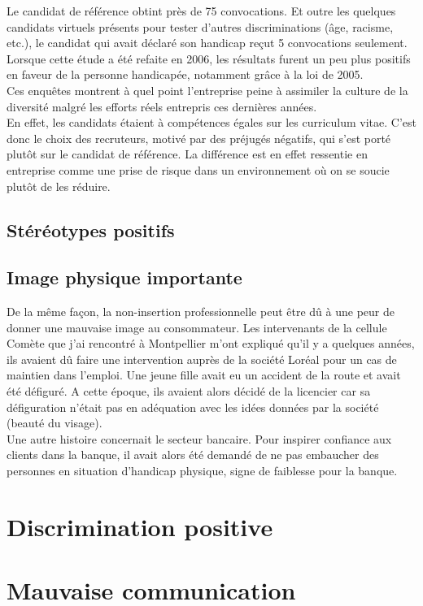 Le candidat de référence obtint près de 75 convocations.
Et outre les quelques candidats virtuels présents pour tester d'autres discriminations (\^age, racisme, etc.), le candidat qui avait déclaré son handicap reçut 5 convocations seulement.\\

Lorsque cette étude a été refaite en 2006, les résultats furent un peu plus positifs en faveur de la personne handicapée, notamment gr\^ace à la loi de 2005.\\

Ces enqu\^etes montrent à quel point l'entreprise peine à assimiler la culture de la diversité malgré les efforts réels entrepris ces dernières années. \\
En effet, les candidats étaient à compétences égales sur les curriculum vitae. C'est donc le choix des recruteurs, motivé par des préjugés négatifs, qui s'est porté plut\^ot sur le candidat de référence. La différence est en effet ressentie en entreprise comme une prise de risque dans un environnement où on se soucie plutôt de les réduire.

\subsection{Stéréotypes positifs}




\subsection{Image physique importante}
De la m\^eme façon, la non-insertion professionnelle peut \^etre d\^u à une peur de donner une mauvaise image au consommateur. Les intervenants de la cellule Comète que j'ai rencontré à Montpellier m'ont expliqué qu'il y a quelques années, ils avaient dû faire une intervention auprès de la société Loréal pour un cas de maintien dans l'emploi.
Une jeune fille avait eu un accident de la route et avait été défiguré. A cette époque, ils avaient alors décidé de la licencier car sa défiguration n'était pas en adéquation avec les idées données par la société (beauté du visage).\\

Une autre histoire concernait le secteur bancaire. Pour inspirer confiance aux clients dans la banque, il avait alors été demandé de ne pas embaucher des personnes en situation d'handicap physique, signe de faiblesse pour la banque.

\section{Discrimination positive}




\section{Mauvaise communication}
